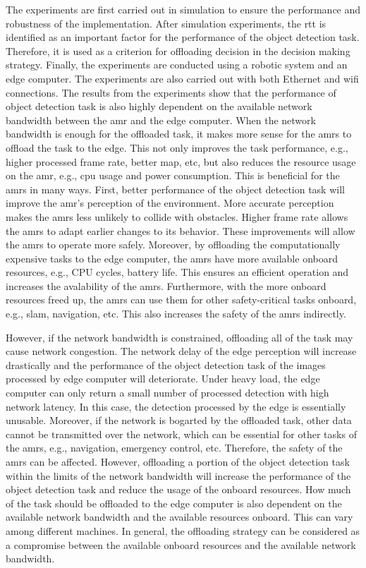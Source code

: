 The experiments are first carried out in simulation to ensure the performance and robustness of the implementation. After simulation experiments, the \gls{rtt} is identified as an important factor for the performance of the object detection task. Therefore, it is used as a criterion for offloading decision in the decision making strategy. Finally, the experiments are conducted using a robotic system and an edge computer. The experiments are also carried out with both Ethernet and \gls{wifi} connections. The results from the experiments show that the performance of object detection task is also highly dependent on the available network bandwidth between the \gls{amr} and the edge computer. When the network bandwidth is enough for the offloaded task, it makes more sense for the \glspl{amr} to offload the task to the edge. This not only improves the task performance, e.g., higher processed frame rate, better \gls{map}, etc, but also reduces the resource usage on the \gls{amr}, e.g., \gls{cpu} usage and power consumption. This is beneficial for the \glspl{amr} in many ways. First, better performance of the object detection task will improve the \gls{amr}'s perception of the environment. More accurate perception makes the \glspl{amr} less unlikely to collide with obstacles. Higher frame rate allows the \glspl{amr} to adapt earlier changes to its behavior. These improvements will allow the \glspl{amr} to operate more safely. Moreover, by offloading the computationally expensive tasks to the edge computer, the \glspl{amr} have more available onboard resources, e.g., CPU cycles, battery life. This ensures an efficient operation and increases the avalability of the \glspl{amr}. Furthermore, with the more onboard resources freed up, the \glspl{amr} can use them for other safety-critical tasks onboard, e.g., \gls{slam}, navigation, etc. This also increases the safety of the \glspl{amr} indirectly.

However, if the network bandwidth is constrained, offloading all of the task may cause network congestion. The network delay of the edge perception will increase drastically and the performance of the object detection task of the images processed by edge computer will deteriorate. Under heavy load, the edge computer can only return a small number of processed detection with high network latency. In this case, the detection processed by the edge is essentially unusable. Moreover, if the network is bogarted by the offloaded task, other data cannot be transmitted over the network, which can be essential for other tasks of the \glspl{amr}, e.g., navigation, emergency control, etc. Therefore, the safety of the \glspl{amr} can be affected. However, offloading a portion of the object detection task within the limits of the network bandwidth will increase the performance of the object detection task and reduce the usage of the onboard resources. How much of the task should be offloaded to the edge computer is also dependent on the available network bandwidth and the available resources onboard. This can vary among different machines. In general, the offloading strategy can be considered as a compromise between the available onboard resources and the available network bandwidth. 

